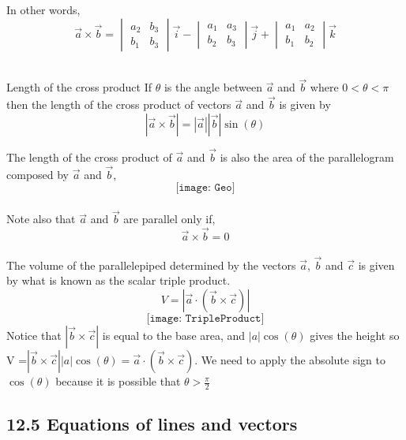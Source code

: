 \documentclass{article}
\begin{document}
	In other words, \\
	\[
		\vec{a}\times \vec{b}=
		\begin{vmatrix}
			a_{2} & b_{3} \\
			b_{1} & b_{3}
		\end{vmatrix}
		\vec{i}-
		\begin{vmatrix}
			a_{1} & a_{3} \\
			b_{2} & b_{3}
		\end{vmatrix}
		\vec{j}+
		\begin{vmatrix}
			a_{1} & a_{2} \\
			b_{1} & b_{2}
		\end{vmatrix}
		\vec{k}
	\]
	\\
	\begin{mybox}
		{Length of the cross product} If $\theta$ is the angle between $\vec{a}$ and
		$\vec{b}$ where $0 < \theta < \pi$ then the length of the cross product of vectors
		$\vec{a}$ and $\vec{b}$ is given by
		\[
			|\vec{a}\times \vec{b}| = |\vec{a}||\vec{b}|\sin(\theta)
		\]
	\end{mybox}
	The length of the cross product of $\vec{a}$ and $\vec{b}$ is also the area of
	the parallelogram composed by $\vec{a}$ and $\vec{b}$,
	\[
		\texttt{[image: Geo]}
	\]
	\\ Note also that $\vec{a}$ and $\vec{b}$ are parallel only if, \\
	\[
		\vec{a}\times \vec{b}= 0
	\]
	\\ The volume of the parallelepiped determined by the vectors $\vec{a}$,
	$\vec{b}$ and $\vec{c}$ is given by what is known as the scalar triple product.
	\\

	\[
		V = |\vec{a}\cdot (\vec{b}\times \vec{c})|
	\]
	\[
		\texttt{[image: TripleProduct]}
	\]
	Notice that $|\vec{b}\times \vec{c}|$ is equal to the base area, and $|a|\cos(\theta
	)$ gives the height so V =$|\vec{b}\times \vec{c}||a|\cos(\theta) = \vec{a}\cdot
	(\vec{b}\times \vec{c})$. We need to apply the absolute sign to $\cos(\theta)$
	because it is possible that $\theta > \frac{\pi}{2}$

	\subsection{12.5 Equations of lines and vectors}
\end{document}
